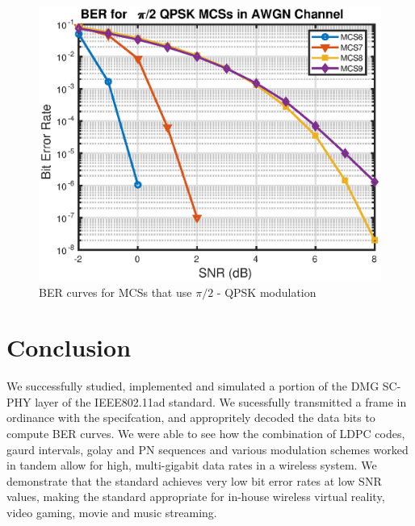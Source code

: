 \documentclass[conference]{IEEEtran}
\begin{document}
\begin{figure}[htp]
\centerline{\includegraphics[scale=.6]{./media/qpsk.eps}}
\caption{BER curves for MCSs that use $\pi/2$ - QPSK modulation}
\label{qpsk}
\end{figure} 



\section{Conclusion} 
We successfully studied, implemented and simulated a portion of the DMG SC-PHY layer of the IEEE802.11ad standard. We sucessfully transmitted a frame in ordinance with the specifcation, and appropritely decoded the data bits to compute BER curves. We were able to see how the combination of LDPC codes, gaurd intervals, golay and PN sequences and various modulation schemes worked in tandem allow for high, multi-gigabit data rates in a wireless system. We demonstrate that the standard achieves very low bit error rates at low SNR values, making the standard appropriate for in-house wireless virtual reality, video gaming, movie and music streaming. 



\end{document}
